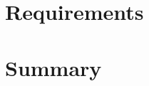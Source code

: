 
\section{Requirements}\label{chap:evaluation:requirements}




\section{Summary}\label{chap:evaluation:summary}
